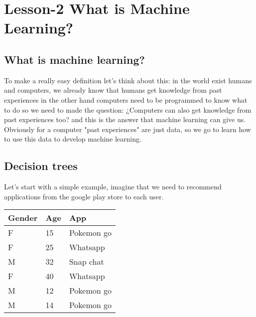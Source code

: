 \chapter{Lesson-2 What is Machine Learning?}
\section{What is machine learning?}
To make a really easy definition let's think about this: in the world exist humans and computers, we already know that humans get knowledge from past experiences in the other hand computers need to be programmed to know what to do so we need to made the question: ¿Computers can also get knowledge from past experiences too? and this is the answer that machine learning can give us. Obviously for a computer "past experiences" are just data, so we go to learn how to use this data to develop machine learning.

\section{Decision trees}
Let's start with a simple example, imagine that we need to recommend applications from the google play store to each user.

\begin{longtable}[c]{@{}lll@{}}
    \rowcolor[HTML]{010066}
    {\color[HTML]{FFFFFF} \textbf{Gender}} & {\color[HTML]{FFFFFF} \textbf{Age}} & {\color[HTML]{FFFFFF} \textbf{App}} \\*
    \endfirsthead
    \endhead
    \rowcolor[HTML]{FFFFFF}
    F                                      & 15                                  & {\color[HTML]{333333} Pokemon go}   \\
    F                                      & 25                                  & Whatsapp                            \\
    M                                      & 32                                  & Snap chat                           \\
    F                                      & 40                                  & Whatsapp                            \\
    M                                      & 12                                  & Pokemon go                          \\
    M                                      & 14                                  & Pokemon go                         
\end{longtable}

